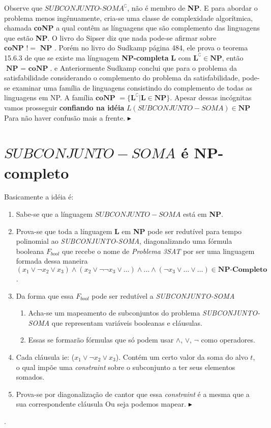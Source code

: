 \documentclass[12pt, a4paper]{article}
\begin{document}
Observe que $\textit{SUBCONJUNTO-SOMA}^\complement$, não é membro de \textbf{NP}. E para abordar o problema menos ingênuamente, cria-se uma classe de complexidade algorítmica, chamada \textbf{coNP} a qual contêm as línguagens que são complemento das linguagens que estão \textbf{NP}. O livro do Sipser diz que nada pode-se afirmar sobre                                                                                                                                                                                              $\textbf{coNP } != \textbf{ NP}$ \cite{sipser06}. Porém no livro do Sudkamp página 484, ele prova o teorema 15.6.3 de que se existe ma línguagem \textbf{NP-completa} \textbf{L} com $\textbf{L}^\complement \in \textbf{NP}$, então $\textbf{NP } = \textbf{ coNP}$. e Anteriormente Sudkamp conclui que para o problema da satisfabilidade considerando o complemento do problema da satisfabilidade, pode-se examinar uma família de linguagens consistindo do complemento de todas as linguagens em NP. A família $\textbf{coNP } = {\lbrace \textbf{L}^\complement | \textbf{L} \in \textbf{NP} \rbrace}$. Apesar dessas incógnitas vamos prosseguir \textbf{confiando na idéia} $L(SUBCONJUNTO-SOMA) \in \textbf{NP}$ Para não haver confusão mais a frente. $\blacktriangleright$

\section{$SUBCONJUNTO-SOMA$ é \textbf{NP-completo}}

Basicamente a idéia é:

\begin{enumerate}
  \item Sabe-se que a línguagem $SUBCONJUNTO-SOMA$ está em \textbf{NP}.
  \item Prova-se que toda a línguagem \textbf{L} em \textbf{NP} pode ser redutível para tempo polinomial ao \textit{SUBCONJUNTO-SOMA}, diagonalizando uma fórmula booleana $F_{bool}$ que recebe o nome de \textit{Problema 3SAT} por ser uma linguagem formada dessa maneira $(x_1 \vee \neg x_2 \vee x_3) \wedge (x_2 \vee \neg \neg x_3 \vee \ldots) \wedge \ldots \wedge (\neg x_3 \vee \ldots \vee \ldots) \in \textbf{NP-Completo}$.
  \item Da forma que essa $F_{bool}$ pode ser redutível a \textit{SUBCONJUNTO-SOMA}
  \begin{enumerate}
    \item Acha-se um mapeamento de subconjuntos do problema \textit{SUBCONJUNTO-SOMA} que representam variáveis booleanas e cláusulas.
    \item Essas se formarão fórmulas que só podem usar $\wedge$, $\vee$, $\neg$ como operadores.
  \end{enumerate}
  \item Cada cláusula ie: ($x_1 \vee \neg x_2 \vee x_3$). Contém um certo valor da soma do alvo $t$, o qual impõe uma \textit{constraint} sobre o subconjunto a ter seus elementos somados.
  \item Prova-se por diagonalização de cantor que essa \textit{constraint} é a mesma que a sua correspondente cláusula  Ou seja podemos mapear. $\blacktriangleright$
\end{enumerate}.
\end{document}
